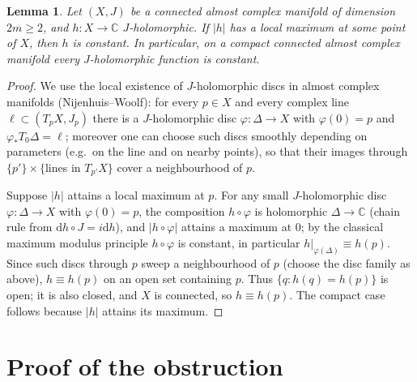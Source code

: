 \documentclass[11pt]{article}
\newtheorem{lemma}[theorem]{Lemma}
\theoremstyle{definition}
\theoremstyle{remark}
\newcommand{\CC}{\mathbb{C}}
\newcommand{\dd}{\mathrm{d}}
\begin{document}
\begin{lemma}\label{lem:max}
Let $(X,J)$ be a connected almost complex manifold of dimension
$2m\ge2$, and $h\colon X\to\CC$ $J$-holomorphic. If $|h|$ has a
local maximum at some point of $X$, then $h$ is constant. In
particular, on a compact connected almost complex manifold every
$J$-holomorphic function is constant.
\end{lemma}

\begin{proof}
We use the local existence of $J$-holomorphic discs in almost
complex manifolds (Nijenhuis--Woolf): for every $p\in X$ and every
complex line $\ell\subset(T_pX,J_p)$ there is a $J$-holomorphic disc
$\varphi\colon\Delta\to X$ with $\varphi(0)=p$ and
$\varphi_{*}T_0\Delta=\ell$; moreover one can choose such discs
smoothly depending on parameters (e.g.\ on the line and on nearby
points), so that their images through $\{p'\}\times\{$lines in
$T_{p'}X\}$ cover a neighbourhood of $p$.

Suppose $|h|$ attains a local maximum at $p$. For any small
$J$-holomorphic disc $\varphi\colon\Delta\to X$ with
$\varphi(0)=p$, the composition $h\circ\varphi$ is holomorphic
$\Delta\to\CC$ (chain rule from $\dd h\circ J=i\dd h$), and
$|h\circ\varphi|$ attains a maximum at $0$; by the classical
maximum modulus principle $h\circ\varphi$ is constant, in
particular $h|_{\varphi(\Delta)}\equiv h(p)$. Since such discs
through $p$ sweep a neighbourhood of $p$ (choose the disc family as
above), $h\equiv h(p)$ on an open set containing $p$. Thus
$\{q:h(q)=h(p)\}$ is open; it is also closed, and $X$ is
connected, so $h\equiv h(p)$. The compact case follows because
$|h|$ attains its maximum.
\end{proof}

\section{Proof of the obstruction}\label{sec:proof}
\end{document}
